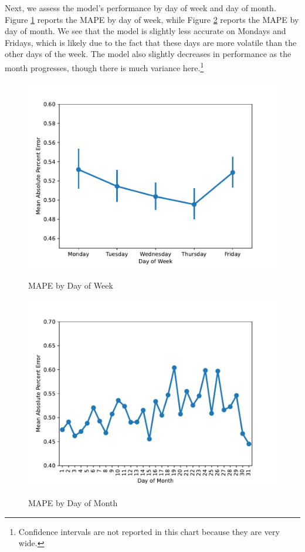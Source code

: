 \documentclass[12pt]{article}
\begin{document}
Next, we assess the model's performance by day of week and day of month. Figure \ref{fig:mape_by_day_of_week} reports the MAPE by day of week, while Figure \ref{fig:mape_by_day_of_month} reports the MAPE by day of month. We see that the model is slightly less accurate on Mondays and Fridays, which is likely due to the fact that these days are more volatile than the other days of the week. The model also slightly decreases in performance as the month progresses, though there is much variance here.\footnote{Confidence intervals are not reported in this chart because they are very wide.}
\begin{figure}[H]
    \centering
    \caption{MAPE by Day of Week}
    \includegraphics[width=0.75\linewidth]{../Output/mape_by_day_of_week.pdf}
    \label{fig:mape_by_day_of_week}
\end{figure}

\begin{figure}[H]
    \centering
    \caption{MAPE by Day of Month}
    \includegraphics[width=0.75\linewidth]{../Output/mape_by_day_of_month.pdf}
    \label{fig:mape_by_day_of_month}
\end{figure}
\end{document}

